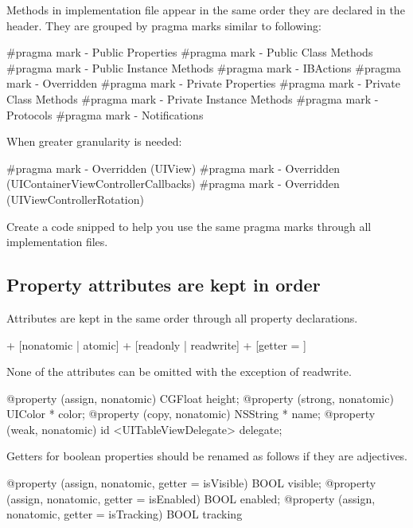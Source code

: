 \documentclass[10pt]{extarticle}
\newenvironment{codelisting}
{\footnotesize\mdframed[middlelinewidth=0.5pt, middlelinecolor=BaliHaiColor, skipabove=15pt]\verbatim}
{\endverbatim\endmdframed\vspace{12pt}\normalsize}
\newenvironment{tiplisting}
{\small\mdframed[middlelinewidth=0.5pt, middlelinecolor=GoldenDreamColor, skipabove=15pt]{\textbf{Tip:}}}
{\endmdframed\vspace{12pt}\normalsize}
\begin{document}
Methods in implementation file appear in the same order they are declared in the header. They are grouped by pragma marks similar to following:

\begin{codelisting}
#pragma mark - Public Properties
#pragma mark - Public Class Methods
#pragma mark - Public Instance Methods
#pragma mark - IBActions
#pragma mark - Overridden
#pragma mark - Private Properties
#pragma mark - Private Class Methods
#pragma mark - Private Instance Methods
#pragma mark - Protocols
#pragma mark - Notifications
\end{codelisting}

When greater granularity is needed:

\begin{codelisting}
#pragma mark - Overridden (UIView)
#pragma mark - Overridden (UIContainerViewControllerCallbacks)
#pragma mark - Overridden (UIViewControllerRotation)
\end{codelisting}

\begin{tiplisting}
Create a code snipped to help you use the same pragma marks through all implementation files.
\end{tiplisting}

\subsection{Property attributes are kept in order}
Attributes are kept in the same order through all property declarations.

\begin{codelisting}
[assign | weak | strong | copy] + [nonatomic | atomic] + [readonly | readwrite] + [getter = ]
\end{codelisting}

None of the attributes can be omitted with the exception of readwrite.

\begin{codelisting}
@property (assign, nonatomic) CGFloat height;
@property (strong, nonatomic) UIColor * color;
@property (copy, nonatomic) NSString * name;
@property (weak, nonatomic) id <UITableViewDelegate> delegate;
\end{codelisting}

Getters for boolean properties should be renamed as follows if they are adjectives.

\begin{codelisting}
@property (assign, nonatomic, getter = isVisible) BOOL visible;
@property (assign, nonatomic, getter = isEnabled) BOOL enabled;
@property (assign, nonatomic, getter = isTracking) BOOL tracking
\end{codelisting}
\end{document}
